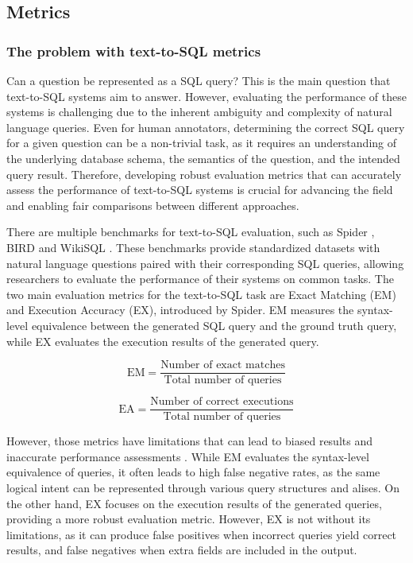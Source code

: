 \subsection{Metrics}

\subsubsection{The problem with text-to-SQL metrics}

Can a question be represented as a SQL query? This is the main question that text-to-SQL systems aim to answer. However, evaluating the performance of these systems is challenging due to the inherent ambiguity and complexity of natural language queries. Even for human annotators, determining the correct SQL query for a given question can be a non-trivial task, as it requires an understanding of the underlying database schema, the semantics of the question, and the intended query result. Therefore, developing robust evaluation metrics that can accurately assess the performance of text-to-SQL systems is crucial for advancing the field and enabling fair comparisons between different approaches.

There are multiple benchmarks for text-to-SQL evaluation, such as Spider \cite{yu_spider_2018}, BIRD \cite{li_can_2023} and WikiSQL \cite{zhongSeq2SQL2017}. These benchmarks provide standardized datasets with natural language questions paired with their corresponding SQL queries, allowing researchers to evaluate the performance of their systems on common tasks. The two main evaluation metrics for the text-to-SQL task are Exact Matching (EM) and Execution Accuracy (EX), introduced by Spider. EM measures the syntax-level equivalence between the generated SQL query and the ground truth query, while EX evaluates the execution results of the generated query.

\begin{equation}
    \text{EM} = \frac{\text{Number of exact matches}}{\text{Total number of queries}}
\end{equation}

\begin{equation}
    \text{EA} = \frac{\text{Number of correct executions}}{\text{Total number of queries}}
\end{equation}


However, those metrics have limitations that can lead to biased results and inaccurate performance assessments \cite{kim_flex_2024}. While EM evaluates the syntax-level equivalence of queries, it often leads to high false negative rates, as the same logical intent can be represented through various query structures and alises. On the other hand, EX focuses on the execution results of the generated queries, providing a more robust evaluation metric. However, EX is not without its limitations, as it can produce false positives when incorrect queries yield correct results, and false negatives when extra fields are included in the output.

